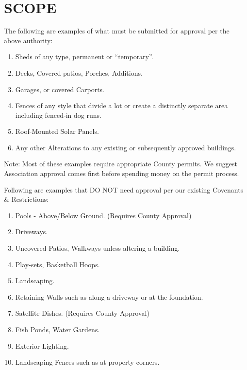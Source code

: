 \documentclass[10pt, letterpaper]{article}
\begin{document}
\section{SCOPE} The following are examples of what must be submitted for approval per the above authority:
\begin{enumerate}
  \item Sheds of any type, permanent or ``temporary''.
  \item Decks, Covered patios, Porches, Additions.
  \item Garages, or covered Carports.
  \item Fences of any style that divide a lot or create a distinctly separate area including fenced-in dog runs.
  \item Roof-Mounted Solar Panels.
  \item Any other Alterations to any existing or subsequently approved buildings.
\end{enumerate}

Note: Most of these examples require appropriate County permits.
We suggest Association approval comes first before spending money on the permit process.

Following are examples that DO NOT need approval per our existing Covenants \& Restrictions:
\begin{enumerate}
  \item Pools - Above/Below Ground. (Requires County Approval)
  \item Driveways.
  \item Uncovered Patios, Walkways unless altering a building.
  \item Play-sets, Basketball Hoops.
  \item Landscaping.
  \item Retaining Walls such as along a driveway or at the foundation.
  \item Satellite Dishes. (Requires County Approval)
  \item Fish Ponds, Water Gardens.
  \item Exterior Lighting.
  \item Landscaping Fences such as at property corners.
\end{enumerate}
\end{document}
